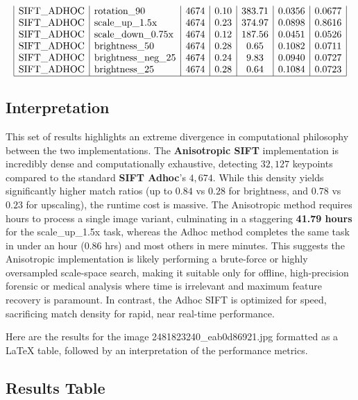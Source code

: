 \documentclass[conference]{IEEEtran}
\begin{document}
$$\begin{array}{|l|l|c|c|c|c|c|}
\text{SIFT\_ADHOC} & \text{rotation\_90} & 4674 & 0.10 & 383.71 & 0.0356 & 0.0677 \\
\text{SIFT\_ADHOC} & \text{scale\_up\_1.5x} & 4674 & 0.23 & 374.97 & 0.0898 & 0.8616 \\
\text{SIFT\_ADHOC} & \text{scale\_down\_0.75x} & 4674 & 0.12 & 187.56 & 0.0451 & 0.0526 \\
\text{SIFT\_ADHOC} & \text{brightness\_50} & 4674 & 0.28 & 0.65 & 0.1082 & 0.0711 \\
\text{SIFT\_ADHOC} & \text{brightness\_neg\_25} & 4674 & 0.24 & 9.83 & 0.0940 & 0.0727 \\
\text{SIFT\_ADHOC} & \text{brightness\_25} & 4674 & 0.28 & 0.64 & 0.1084 & 0.0723 \\ \hline
\end{array}$$



\subsection*{Interpretation}


This set of results highlights an extreme divergence in computational philosophy between the two implementations. The \textbf{Anisotropic SIFT} implementation is incredibly dense and computationally exhaustive, detecting $32,127$ keypoints compared to the standard \textbf{SIFT Adhoc}'s $4,674$. While this density yields significantly higher match ratios (up to $0.84$ vs $0.28$ for brightness, and $0.78$ vs $0.23$ for upscaling), the runtime cost is massive. The Anisotropic method requires hours to process a single image variant, culminating in a staggering \textbf{41.79 hours} for the scale_up_1.5x task, whereas the Adhoc method completes the same task in under an hour ($0.86$ hrs) and most others in mere minutes. This suggests the Anisotropic implementation is likely performing a brute-force or highly oversampled scale-space search, making it suitable only for offline, high-precision forensic or medical analysis where time is irrelevant and maximum feature recovery is paramount. In contrast, the Adhoc SIFT is optimized for speed, sacrificing match density for rapid, near real-time performance.


Here are the results for the image 2481823240_eab0d86921.jpg formatted as a LaTeX table, followed by an interpretation of the performance metrics.



\subsection*{Results Table}
\end{document}
